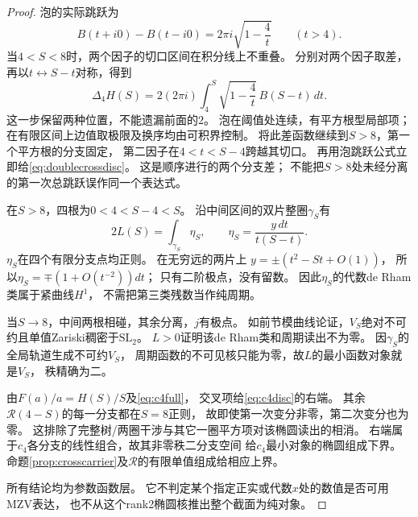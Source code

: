 \documentclass[11pt,a4paper]{ctexart}
\theoremstyle{cnplain}\newtheorem{theorem}{定理}[section]
\theoremstyle{definition}\newtheorem{definition}[theorem]{定义}
\theoremstyle{remark}\newtheorem{remark}[theorem]{注}
\begin{document}
\begin{proof}
泡的实际跳跃为
\[
 B(t+i0)-B(t-i0)=2\pi i\sqrt{1-\frac4t}\qquad(t>4).
\]
当$4<S<8$时，两个因子的切口区间在积分线上不重叠。
分别对两个因子取差，再以$t\leftrightarrow S-t$对称，得到
\[
 \Delta_4H(S)=
       2(2\pi i)\int_4^S\sqrt{1-\frac4t}\,B(S-t)\,dt .
\]
这一步保留两种位置，不能遗漏前面的$2$。
泡在阈值处连续，有平方根型局部项；
在有限区间上边值取极限及换序均由可积界控制。
将此差函数继续到$S>8$，第一个平方根的分支固定，
第二因子在$4<t<S-4$跨越其切口。
再用泡跳跃公式立即给\eqref{eq:doublecrossdisc}。
这是顺序进行的两个分支差；
不能把$S>8$处未经分离的第一次总跳跃误作同一个表达式。

在$S>8$，四根为$0<4<S-4<S$。
沿中间区间的双片整圈$\gamma_S$有
\[
 2L(S)=\int_{\gamma_S}\eta_S,\qquad
 \eta_S=\frac{y\,dt}{t(S-t)}.
\]
$\eta_S$在四个有限分支点均正则。
在无穷远的两片上
$y=\pm(t^2-St+O(1))$，
所以$\eta_S=\mp(1+O(t^{-2}))dt$；
只有二阶极点，没有留数。
因此$\eta_S$的代数de Rham类属于紧曲线$H^1$，
不需把第三类残数当作纯周期。

当$S\to8$，中间两根相碰，其余分离，$j$有极点。
如前节模曲线论证，$V_S$绝对不可约且单值Zariski稠密于$\mathrm{SL}_2$。
$L>0$证明该de Rham类和周期读出不为零。
因$\gamma_S$的全局轨道生成不可约$V_S$，
周期函数的不可见核只能为零，故$L$的最小函数对象就是$V_S$，
秩精确为二。

由$F(a)/a=H(S)/S$及\eqref{eq:c4full}，
交叉项给\eqref{eq:c4disc}的右端。
其余$\mathcal R(4-S)$的每一分支都在$S=8$正则，
故即使第一次变分非零，第二次变分也为零。
这排除了完整树/两圈干涉与其它一圈平方项对该椭圆读出的相消。
右端属于$c_4$各分支的线性组合，故其非零秩二分支空间
给$c_4$最小对象的椭圆组成下界。
命题\ref{prop:crosscarrier}及$\mathcal R$的有限单值组成给相应上界。

所有结论均为参数函数层。
它不判定某个指定正实或代数$x$处的数值是否可用MZV表达，
也不从这个rank2椭圆核推出整个截面为纯对象。
\end{proof}
\end{document}
